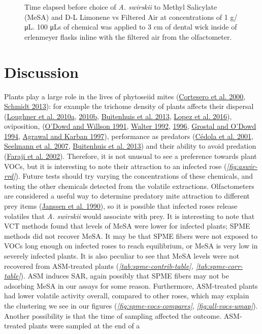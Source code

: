 \documentclass[12pt,final,CPage]{ufthesis}
\begin{document}
{\begin{figure}
{  }

  \caption{Time elapsed before choice of \textit{A. swirskii} to Methyl Salicylate (MeSA) and D-L Limonene vs Filtered Air at concentrations of 1 g/\si{\micro\liter}. 100 \si{\micro\liter}s of chemical was applied to 3 cm of dental wick inside of erlenmeyer flasks inline with the filtered air from the olfactometer.}\label{fig:aswir-mesa-lim-times}
  \end{figure}
  \hypertarget{dis-vocs-olfact}{%
  \section{Discussion}\label{dis-vocs-olfact}}

  Plants play a large role in the lives of phytoseiid mites (\protect\hyperlink{ref-Cortesero2000}{Cortesero et al. 2000}, \protect\hyperlink{ref-Schmidt2013}{Schmidt 2013}): for example the trichome density of plants affects their dispersal (\protect\hyperlink{ref-Loughner2010}{Loughner et al. 2010a}, \protect\hyperlink{ref-Loughner2010a}{2010b}, \protect\hyperlink{ref-Buitenhuis2013}{Buitenhuis et al. 2013}, \protect\hyperlink{ref-Lopez2016}{Lopez et al. 2016}), oviposition, (\protect\hyperlink{ref-ODowd1991}{O'Dowd and Willson 1991}, \protect\hyperlink{ref-Walter1992}{Walter 1992}, \protect\hyperlink{ref-Walter1996}{1996}, \protect\hyperlink{ref-Grostal1994}{Grostal and O'Dowd 1994}, \protect\hyperlink{ref-Agrawal1997}{Agrawal and Karban 1997}), performance as predators (\protect\hyperlink{ref-Cedola2001}{Cédola et al. 2001}, \protect\hyperlink{ref-Seelmann2007}{Seelmann et al. 2007}, \protect\hyperlink{ref-Buitenhuis2013}{Buitenhuis et al. 2013}) and their ability to avoid predation (\protect\hyperlink{ref-Faraji2002}{Faraji et al. 2002}). Therefore, it is not unusual to see a preference towards plant VOCs, but it is interesting to note their attraction to an infected rose (\emph{\ref{fig:aswir-rrd}}). Future tests should try varying the concentrations of these chemicals, and testing the other chemicals detected from the volatile extractions. Olfactometers are considered a useful way to determine predatory mite attraction to different prey items (\protect\hyperlink{ref-Janssen1990}{Janssen et al. 1990}), so it is possible that infected roses release volatiles that \emph{A. swirskii} would associate with prey. It is interesting to note that VCT methods found that levels of MeSA were lower for infected plants; SPME methods did not recover MeSA. It may be that SPME fibers were not exposed to VOCs long enough on infected roses to reach equilibrium, or MeSA is very low in severely infected plants. It is also peculiar to see that MeSA levels were not recovered from ASM-treated plants (\emph{\ref{tab:spme-contrib-table}, \ref{tab:spme-corr-table}}). ASM induces SAR, again possibly that SPME fibers may not be adsorbing MeSA in our assays for some reason. Furthermore, ASM-treated plants had lower volatile activity overall, compared to other roses, which may explain the clustering we see in our figures (\emph{\ref{fig:spme-vocs-compares}}, \emph{\ref{fig:all-vocs-umap}}). Another possibility is that the time of sampling affected the outcome. ASM-treated plants were sampled at the end of a }
\end{document}
